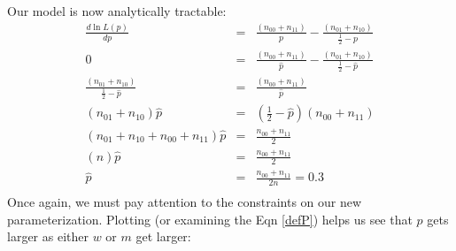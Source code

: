 \documentclass[11pt]{article}
\begin{document}
Our model is now analytically tractable:
\begin{eqnarray*} 
\frac{d \ln L(p)}{d p} & = & \frac{(n_{00} + n_{11})}{p}  - \frac{(n_{01} + n_{10})}{\frac{1}{2}-p} \\
0 & = &  \frac{(n_{00} + n_{11})}{\hat p}  - \frac{(n_{01} + n_{10})}{\frac{1}{2}-\hat p} \\
\frac{(n_{01} + n_{10})}{\frac{1}{2}-\hat p}  & = &  \frac{(n_{00} + n_{11})}{\hat p} \\
(n_{01} + n_{10})\hat p  & = &  (\frac{1}{2}-\hat p)(n_{00} + n_{11})\\
(n_{01} + n_{10}+ n_{00} + n_{11})\hat p  & = &  \frac{n_{00} + n_{11}}{2} \\
(n)\hat p  & = &  \frac{n_{00} + n_{11}}{2} \\
\hat p  & = &  \frac{n_{00} + n_{11}}{2n} = 0.3 \\
\end{eqnarray*}
Once again, we must pay attention to the constraints on our new parameterization.
Plotting (or examining the Eqn \ref{defP}) helps us see that $p$ gets larger as either $w$ or $m$ get larger:\\
\end{document}
